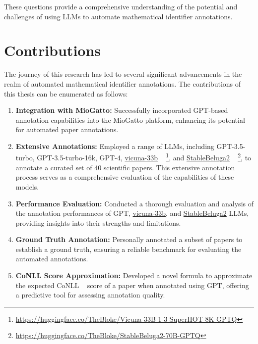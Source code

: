 These questions provide a comprehensive understanding of the potential and challenges of using LLMs to automate mathematical identifier annotations.

\section{Contributions}

The journey of this research has led to several significant advancements in the realm of automated mathematical identifier annotations. The contributions of this thesis can be enumerated as follows:

\begin{enumerate}
    \item \textbf{Integration with MioGatto:} Successfully incorporated GPT-based annotation capabilities into the MioGatto platform, enhancing its potential for automated paper annotations.
    
    \item \textbf{Extensive Annotations:} Employed a range of LLMs, including GPT-3.5-turbo, GPT-3.5-turbo-16k, GPT-4, \href{https://huggingface.co/TheBloke/Vicuna-33B-1-3-SuperHOT-8K-GPTQ}{vicuna-33b} ~\citep{zheng2023judging} \footnote{\url{https://huggingface.co/TheBloke/Vicuna-33B-1-3-SuperHOT-8K-GPTQ}}, and \href{https://huggingface.co/TheBloke/StableBeluga2-70B-GPTQ}{StableBeluga2} ~\citep{StableBelugaModels, touvron2023llama, mukherjee2023orca} \footnote{\url{https://huggingface.co/TheBloke/StableBeluga2-70B-GPTQ}}, to annotate a curated set of 40 scientific papers. This extensive annotation process serves as a comprehensive evaluation of the capabilities of these models.
    
    \item \textbf{Performance Evaluation:} Conducted a thorough evaluation and analysis of the annotation performances of GPT, \href{https://huggingface.co/TheBloke/Vicuna-33B-1-3-SuperHOT-8K-GPTQ}{vicuna-33b}, and \href{https://huggingface.co/TheBloke/StableBeluga2-70B-GPTQ}{StableBeluga2} LLMs, providing insights into their strengths and limitations.
    
    \item \textbf{Ground Truth Annotation:} Personally annotated a subset of papers to establish a ground truth, ensuring a reliable benchmark for evaluating the automated annotations.
    
    \item \textbf{CoNLL Score Approximation:} Developed a novel formula to approximate the expected CoNLL ~\citep{pradhan2012conll} score of a paper when annotated using GPT, offering a predictive tool for assessing annotation quality.
\end{enumerate}

